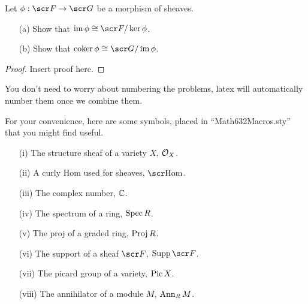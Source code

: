 \documentclass[12pt,twoside,fullpage]{amsart}
\begin{document}
\begin{problem}
Let $\phi : \sF \rightarrow \sG$ be a morphism of sheaves.
\begin{itemize}
\item[(a)]  Show that $\im \phi \cong \sF / \ker \phi$.
\item[(b)]  Show that $\coker \phi \cong \sG / \im \phi$.
\end{itemize}
\end{problem}
\begin{proof}
Insert proof here.
\end{proof}
You don't need to worry about numbering the problems, latex will automatically number them once we combine them.

\vskip 50pt


For your convenience, here are some symbols, placed in ``Math632Macros.sty'' that you might find useful.

\begin{itemize}
\item[(i)]  The structure sheaf of a variety $X$, $\mbox{$\mathcal{O}$}_X$.
\item[(ii)]  A curly Hom used for sheaves, $\sHom$.
\item[(iii)]  The complex number, $\mathbb{C}$.
\item[(iv)]  The spectrum of a ring, $\operatorname{{Spec}} R$.
\item[(v)]  The proj of a graded ring, $\operatorname{{Proj}} R$.
\item[(vi)]  The support of a sheaf $\sF$, $\Supp \sF$.
\item[(vii)]  The picard group of a variety, $\operatorname{{Pic}} X$.
\item[(viii)]  The annihilator of a module $M$, $\operatorname{{Ann}}_R M$.
\end{itemize}
\end{document}
